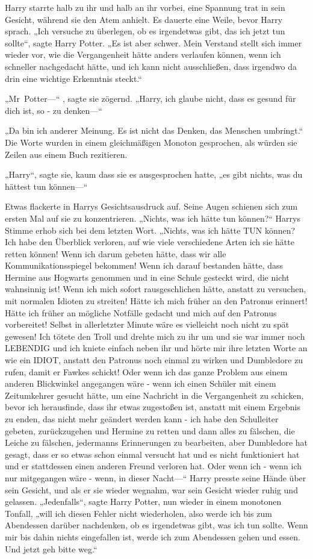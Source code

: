 {Harry starrte halb zu ihr und halb an ihr vorbei, eine Spannung trat in sein Gesicht, während sie den Atem anhielt. Es dauerte eine Weile, bevor Harry sprach. „Ich versuche zu überlegen, ob es irgendetwas gibt, das ich jetzt tun sollte“, sagte Harry Potter. „Es ist aber schwer. Mein Verstand stellt sich immer wieder vor, wie die Vergangenheit hätte anders verlaufen können, wenn ich schneller nachgedacht hätte, und ich kann nicht ausschließen, dass irgendwo da drin eine wichtige Erkenntnis steckt.“

„Mr~Potter—“ , sagte sie zögernd. „Harry, ich glaube nicht, dass es gesund für dich ist, so - zu denken—“

„Da bin ich anderer Meinung. Es ist nicht das Denken, das Menschen umbringt.“ Die Worte wurden in einem gleichmäßigen Monoton gesprochen, als würden sie Zeilen aus einem Buch rezitieren.

„Harry“, sagte sie, kaum dass sie es ausgesprochen hatte, „es gibt nichts, was du hättest tun können—“

Etwas flackerte in Harrys Gesichtsausdruck auf. Seine Augen schienen sich zum ersten Mal auf sie zu konzentrieren. „Nichts, was ich hätte tun können?“ Harrys Stimme erhob sich bei dem letzten Wort. „Nichts, was ich hätte TUN können? Ich habe den Überblick verloren, auf wie viele verschiedene Arten ich sie hätte retten können! Wenn ich darum gebeten hätte, dass wir alle Kommunikationsspiegel bekommen! Wenn ich darauf bestanden hätte, dass Hermine aus Hogwarts genommen und in eine Schule gesteckt wird, die nicht wahnsinnig ist! Wenn ich mich sofort rausgeschlichen hätte, anstatt zu versuchen, mit normalen Idioten zu streiten! Hätte ich mich früher an den Patronus erinnert! Hätte ich früher an mögliche Notfälle gedacht und mich auf den Patronus vorbereitet! Selbst in allerletzter Minute wäre es vielleicht noch nicht zu spät gewesen! Ich tötete den Troll und drehte mich zu ihr um und sie war immer noch LEBENDIG und ich kniete einfach neben ihr und hörte mir ihre letzten Worte an wie ein IDIOT, anstatt den Patronus noch einmal zu wirken und Dumbledore zu rufen, damit er Fawkes schickt! Oder wenn ich das ganze Problem aus einem anderen Blickwinkel angegangen wäre - wenn ich einen Schüler mit einem Zeitumkehrer gesucht hätte, um eine Nachricht in die Vergangenheit zu schicken, bevor ich herausfinde, dass ihr etwas zugestoßen ist, anstatt mit einem Ergebnis zu enden, das nicht mehr geändert werden kann - ich habe den Schulleiter gebeten, zurückzugehen und Hermine zu retten und dann alles zu fälschen, die Leiche zu fälschen, jedermanns Erinnerungen zu bearbeiten, aber Dumbledore hat gesagt, dass er so etwas schon einmal versucht hat und es nicht funktioniert hat und er stattdessen einen anderen Freund verloren hat. Oder wenn ich - wenn ich nur mitgegangen wäre - wenn, in dieser Nacht—“ Harry presste seine Hände über sein Gesicht, und als er sie wieder wegnahm, war sein Gesicht wieder ruhig und gelassen. „Jedenfalls“, sagte Harry Potter, nun wieder in einem monotonen Tonfall, „will ich diesen Fehler nicht wiederholen, also werde ich bis zum Abendessen darüber nachdenken, ob es irgendetwas gibt, was ich tun sollte. Wenn mir bis dahin nichts eingefallen ist, werde ich zum Abendessen gehen und essen. Und jetzt geh bitte weg.“

}
